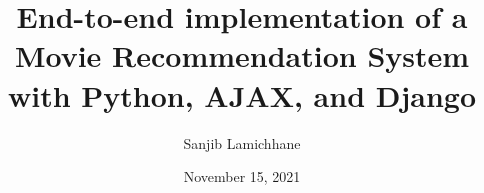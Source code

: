 \title{%
	\small  End-to-end implementation of a \\
	\large Movie Recommendation System \\
	\small with Python, AJAX, and Django}

\author{\large Sanjib Lamichhane}
\date{November 15, 2021}

\begin{titlepage}
	\maketitle
\end{titlepage}